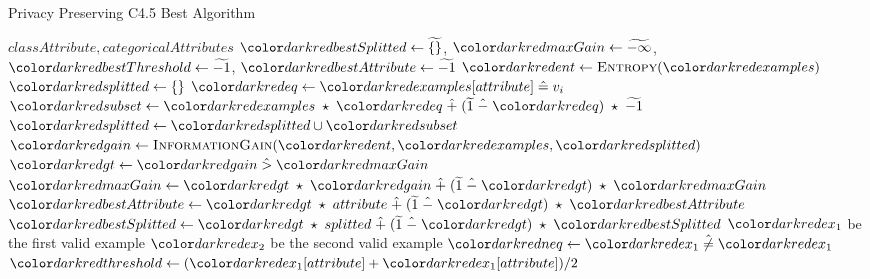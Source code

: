 \begin{algorithm}[H]
\caption{Privacy Preserving C4.5 Best Algorithm}\label{a:c45-best-pp}
\begin{algorithmic}[1]
\renewcommand{\algorithmicrequire}{\textbf{Global Vars:}}
\Require $classAttribute, categoricalAttributes$
  \State $\red{bestSplitted} \gets \enc{\{\}}$,  $\red{maxGain} \gets \enc{-\infty}$, $\red{bestThreshold} \gets \enc{-1}$, $\red{bestAttribute} \gets \enc{-1}$
  \State $\red{ent} \gets  \textsc{Entropy}(\red{examples})$
      \State $\red{splitted} \gets \{\}$
        \State $\red{eq} \gets \red{examples}[attribute] \heq v_i$ 
        \State $\red{subset} \gets \red{examples} \hmul \red{eq} \hplus (\enc{1} \hminus \red{eq}) \hmul \enc{-1} $ 
          \State $\red{splitted} \gets \red{splitted} \cup \red{subset}$
        \EndFor
        \State $\red{gain} \gets  \textsc{InformationGain}(\red{ent}, \red{examples}, \red{splitted})$
        \State $\red{gt} \gets \red{gain} \hgt  \red{maxGain}$
        \State $\red{maxGain} \gets \red{gt} \hmul \red{gain} \hplus (\enc{1} \hminus \red{gt}) \hmul \red{maxGain}$ 
        \State $\red{bestAttribute} \gets \red{gt} \hmul attribute \hplus (\enc{1} \hminus \red{gt}) \hmul \red{bestAttribute}$
        \State $\red{bestSplitted} \gets \red{gt} \hmul splitted \hplus (\enc{1} \hminus \red{gt}) \hmul \red{bestSplitted}$
    \Else {}
           $\red{ex_1}$ {\small be the first valid example}
           $\red{ex_2}$ {\small be the second valid example}
          \State $\red{neq} \gets \red{ex_1} \hneq \red{ex_1}$
          \State $\red{threshold} \gets (\red{ex_1}[attribute] + \red{ex_1}[attribute]) / 2$

\end{algorithmic}
\end{algorithm}
